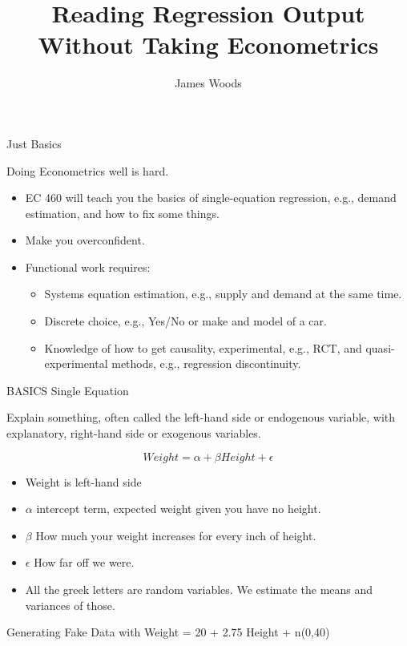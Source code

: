 \documentclass[
  ignorenonframetext,
]{beamer}
\title{Reading Regression Output Without Taking Econometrics}
\author{James Woods}
\date{}
\providecommand{\tightlist}{%
  \setlength{\itemsep}{0pt}\setlength{\parskip}{0pt}}
\begin{document}
\frame{\titlepage}

\begin{frame}{Just Basics}
\protect\hypertarget{just-basics}{}

Doing Econometrics well is hard.

\begin{itemize}
\tightlist
\item
  EC 460 will teach you the basics of single-equation regression, e.g.,
  demand estimation, and how to fix some things.
\item
  Make you overconfident.
\item
  Functional work requires:

  \begin{itemize}
  \tightlist
  \item
    Systems equation estimation, e.g., supply and demand at the same
    time.
  \item
    Discrete choice, e.g., Yes/No or make and model of a car.
  \item
    Knowledge of how to get causality, experimental, e.g., RCT, and
    quasi-experimental methods, e.g., regression discontinuity.
  \end{itemize}
\end{itemize}

\end{frame}

\begin{frame}{BASICS Single Equation}
\protect\hypertarget{basics-single-equation}{}

Explain something, often called the left-hand side or endogenous
variable, with explanatory, right-hand side or exogenous variables.

\[Weight = \alpha + \beta Height + \epsilon\]

\begin{itemize}
\tightlist
\item
  Weight is left-hand side
\item
  \(\alpha\) intercept term, expected weight given you have no height.
\item
  \(\beta\) How much your weight increases for every inch of height.
\item
  \(\epsilon\) How far off we were.
\item
  All the greek letters are random variables. We estimate the means and
  variances of those.
\end{itemize}

Generating Fake Data with Weight = 20 + 2.75 Height + n(0,40)

\end{frame}
\end{document}
